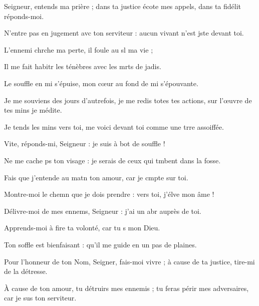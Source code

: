 \item Seigneur, entends ma prière ;\pscross{} dans ta justice écote mes appels,\psstar{} dans ta fidélit réponds-moi.
\item N’entre pas en jugement avc ton serviteur :\psstar{} aucun vivant n’est jste devant toi.
\item L’ennemi chrche ma perte,\psstar{} il foule au sl ma vie ;
\item Il me fait habitr les ténèbres\psstar{} avec les mrts de jadis.
\item Le souffle en mi s’épuise,\psstar{} mon cœur au fond de mi s’épouvante.
\item Je me souviens des jours d’autrefois, je me redis totes tes actions,\psstar{} sur l’œuvre de tes mins je médite.
\item Je tends les mins vers toi,\psstar{} me voici devant toi comme une trre assoiffée.
\item Vite, réponds-mi, Seigneur :\psstar{} je suis à bot de souffle !
\item Ne me cache ps ton visage :\psstar{} je serais de ceux qui tmbent dans la fosse.
\item Fais que j’entende au matn ton amour,\psstar{} car je cmpte sur toi.
\item Montre-moi le chemn que je dois prendre :\psstar{} vers toi, j’élve mon âme !
\item Délivre-moi de mes ennems, Seigneur :\psstar{} j’ai un abr auprès de toi.
\item Apprends-moi à fire ta volonté,\psstar{} car tu s mon Dieu.
\item Ton soffle est bienfaisant :\psstar{} qu’il me guide en un pas de plaines.
\item Pour l’honneur de ton Nom, Seigner, fais-moi vivre ;\psstar{} à cause de ta justice, tire-mi de la détresse.
\item À cause de ton amour, tu détruirs mes ennemis ;\psstar{} tu feras périr mes adversaires, car je sus ton serviteur.